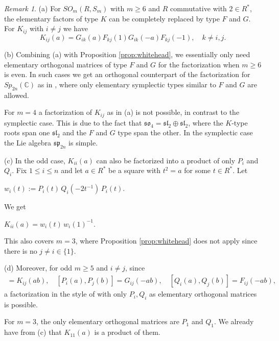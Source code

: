 \documentclass[11pt]{amsart}
\theoremstyle{definition}
\theoremstyle{remark}
\theoremstyle{remark}
\newtheorem{remark}[theorem]{Remark}
\newcommand{\C}{\mathbb{C}}
\begin{document}
\begin{remark} \label{rema-whitehead-odd}
   (a) For $SO_m(R,S_m)$ with $m \geq 6$ and $R$ commutative with $2 \in R^{\ast}$, the elementary factors of type $K$ can be completely replaced by type $F$ and $G$. For $K_{ij}$ with $i \neq j$ we have 
   $$K_{ij}(a) = G_{ik}(a)F_{kj}(1)G_{ik}(-a)F_{kj}(-1), \quad k \neq i, j.$$

    (b) Combining (a) with Proposition \ref{prop:whitehead}, we essentially only need elementary orthogonal matrices of type $F$ and $G$ for the factorization when $m \ge 6$ is even. In such cases we get an orthogonal counterpart of the factorization for $Sp_{2n}(\C)$ as in  \cite{MR4078081}, where only elementary symplectic types similar to $F$ and $G$ are allowed. 
    
    For $m= 4$ a factorization of $K_{ij}$ as in (a) is not possible, in contrast to the symplectic case. This is due to the fact that $\mathfrak{so}_4 = \mathfrak{sl}_2 \oplus \mathfrak{sl}_2$, where the $K$-type roots span one $\mathfrak{sl}_2$ and the $F$ and $G$ type span the other. In the symplectic case the Lie algebra $\mathfrak{sp}_{2n}$ is simple. 

   (c) In the odd case, $K_{ii}(a)$ can also be factorized into a product of only $P_i$ and $Q_i$. Fix $1\le i\le n$ and let $a\in R^\ast$ be a square with $t^2=a$ for some $t\in R^\ast$. Let
    \begin{center}
    $w_{i}(t):=P_{i}(t)\,Q_{i}(-2t^{-1})\,P_{i}(t).$
    \end{center}
    We get
    \begin{center}
    $K_{ii}(a)=w_{i}(t)\,w_{i}(1)^{-1}.$
    \end{center}
    This also covers $m=3$, where Proposition \ref{prop:whitehead} does not apply since there is no $j\neq i \in \{ 1 \}$.

    (d) Moreover, for odd $m \ge 5$ and $i \neq j$, since 
    \begin{align*}
        [P_i(a), Q_j(b)] = K_{ij}(ab), \quad [P_i(a), P_j(b)] = G_{ij}(-ab), \quad [Q_i(a), Q_j(b)] = F_{ij}(-ab),
    \end{align*}
    a factorization in the style of \cite{MR4078081} with only $P_i, Q_i$ as elementary orthogonal matrices is possible. 

    For $m=3$, the only elementary
orthogonal matrices are $P_1$ and $Q_1$. We already have from (c) that $K_{11}(a)$ is a product of them.
\end{remark}
\end{document}
